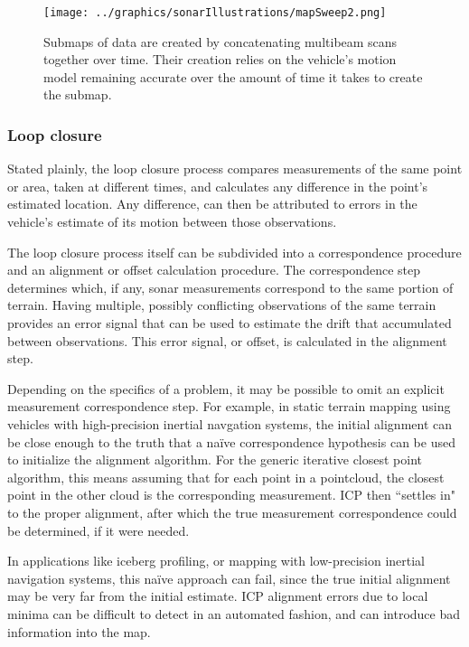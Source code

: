  \begin{figure}[htb]
   \centering
   \texttt{[image: ../graphics/sonarIllustrations/mapSweep2.png]} %
   \caption{Submaps of data are created by concatenating multibeam scans together over time. Their creation relies on the vehicle's motion model remaining accurate over the amount of time it takes to create the submap.}
   \label{fig:SubmapGeneration}
\end{figure}

\subsubsection{Loop closure}

Stated plainly, the loop closure process compares measurements of the same point or area, taken at different times, and calculates any difference in the point's estimated location. Any difference, can then be attributed to errors in the vehicle's estimate of its motion between those observations.

The loop closure process itself can be subdivided into a correspondence procedure and an alignment or offset calculation procedure. The correspondence step determines which, if any, sonar measurements correspond to the same portion of terrain. Having multiple, possibly conflicting observations of the same terrain provides an error signal that can be used to estimate the drift that accumulated between observations. This error signal, or offset, is calculated in the alignment step. 

Depending on the specifics of a problem, it may be possible to omit an explicit measurement correspondence step. For example, in static terrain mapping using vehicles with high-precision inertial navgation systems, the initial alignment can be close enough to the truth that a na\"ive correspondence hypothesis can be used to initialize the alignment algorithm. For the generic iterative closest point algorithm, this means assuming that for each point in a pointcloud, the closest point in the other cloud is the corresponding measurement. ICP then ``settles in" to the proper alignment, after which the true measurement correspondence could be determined, if it were needed. 

In applications like iceberg profiling, or mapping with low-precision inertial navigation systems, this na\"ive approach can fail, since the true initial alignment may be very far from the initial estimate. ICP alignment errors due to local minima can be difficult to detect in an automated fashion, and can introduce bad information into the map. 

